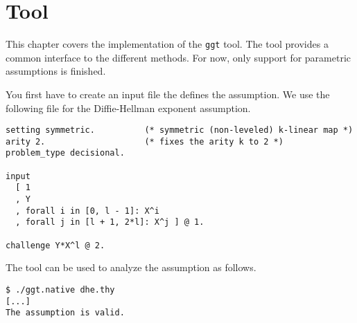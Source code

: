 \chapter{Tool}

This chapter covers the implementation of the \verb!ggt! tool.
The tool provides a common  interface to the different methods.
%
For now, only support for parametric assumptions is finished.

You first have to create an input file the defines the assumption.
We use the following file for the Diffie-Hellman exponent assumption.

\begin{verbatim}
setting symmetric.          (* symmetric (non-leveled) k-linear map *)
arity 2.                    (* fixes the arity k to 2 *)
problem_type decisional.

input
  [ 1
  , Y
  , forall i in [0, l - 1]: X^i
  , forall j in [l + 1, 2*l]: X^j ] @ 1.

challenge Y*X^l @ 2.\end{verbatim}
%
The tool can be used to analyze the assumption as follows.
\begin{verbatim}
$ ./ggt.native dhe.thy
[...]
The assumption is valid.\end{verbatim}